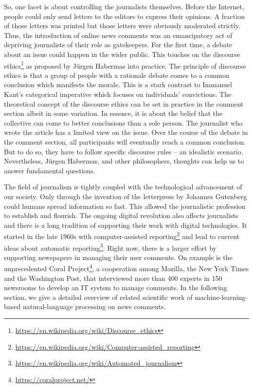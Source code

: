 So, one facet is about controlling the journalists themselves. Before the Internet, people could only send letters to the editors to express their opinions. A fraction of those letters was printed but those letters were obviously moderated strictly. Thus, the introduction of online news comments was an emancipatory act of depriving journalists of their role as gatekeepers. For the first time, a debate about an issue could happen in the wider public. This touches on the discourse ethics\footnote{\url{https://en.wikipedia.org/wiki/Discourse_ethics}} as proposed by J{\"u}rgen Habermas into practice. The principle of discourse ethics is that a group of people with a rationale debate comes to a common conclusion which manifests the morale. This is a stark contrast to Immanuel Kant's categorical imperative which focuses on individuals' convictions. The theoretical concept of the discourse ethics can be set in practice in the comment section albeit in some variation. In essence, it is about the belief that the collective can come to better conclusions than a sole person. The journalist who wrote the article has a limited view on the issue. Over the course of the debate in the comment section, all participants will eventually reach a common conclusion. But to do so, they have to follow specific discourse rules -- an idealistic scenario. Nevertheless, J{\"u}rgen Habermas, and other philosophers, thoughts can help us to answer fundamental questions.

The field of journalism is tightly coupled with the technological advancement of our society. Only through the invention of the letterpress by Johannes Gutenberg could humans spread information so fast. This allowed the journalistic profession to establish and flourish. The ongoing digital revolution also affects journalists and there is a long tradition of supporting their work with digital technologies. It started in the late 1960s with computer-assisted reporting\footnote{\url{https://en.wikipedia.org/wiki/Computer-assisted_reporting}} and lead to current ideas about automatic reporting\footnote{\url{https://en.wikipedia.org/wiki/Automated_journalism}}. Right now, there is a larger effort by supporting newspapers in managing their user comments. On example is the unprecedented Coral Project\footnote{\url{https://coralproject.net/}}, a cooperation among Mozilla, the New York Times and the Washington Post, that interviewed more than 400 experts in 150 newsrooms to develop an IT system to manage comments. In the following section, we give a detailed overview of related scientific work of machine-learning-based natural-language processing on news comments.


